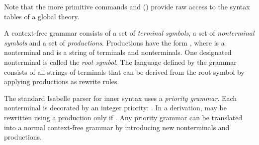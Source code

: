 \begin{isabellebody}
\begin{isamarkuptext}
  Note that the more primitive commands \hyperlink{command.syntax}{\mbox{}} and
  \hyperlink{command.no-syntax}{\mbox{}} () provide raw access
  to the syntax tables of a global theory.%
\end{isamarkuptext}%
\isamarkuptrue%
%
\isamarkuptrue%
%
\isamarkuptrue%
%
\begin{isamarkuptext}%
A context-free grammar consists of a set of \emph{terminal
  symbols}, a set of \emph{nonterminal symbols} and a set of
  \emph{productions}.  Productions have the form ,
  where  is a nonterminal and  is a string of
  terminals and nonterminals.  One designated nonterminal is called
  the \emph{root symbol}.  The language defined by the grammar
  consists of all strings of terminals that can be derived from the
  root symbol by applying productions as rewrite rules.

  The standard Isabelle parser for inner syntax uses a \emph{priority
  grammar}.  Each nonterminal is decorated by an integer priority:
  .  In a derivation,  may be rewritten
  using a production  only if .  Any
  priority grammar can be translated into a normal context-free
  grammar by introducing new nonterminals and productions.


\end{isamarkuptext}
\end{isabellebody}
